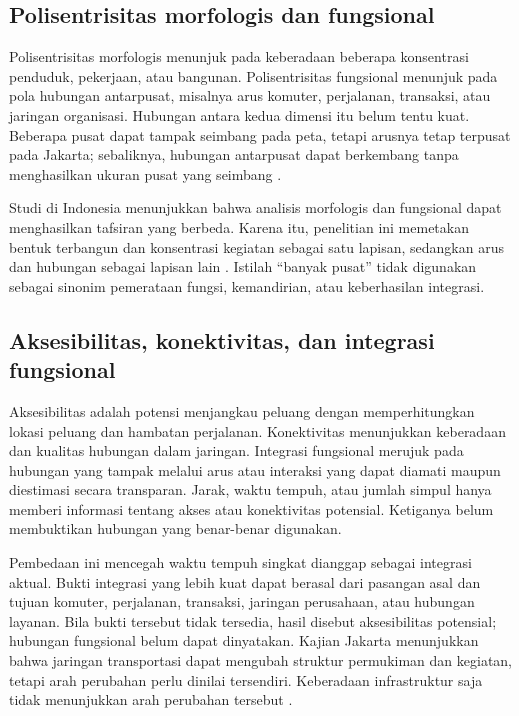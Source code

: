 \documentclass[12pt,a4paper,oneside,openany,indonesian]{report}
\begin{document}
\subsection{Polisentrisitas morfologis dan fungsional}

Polisentrisitas morfologis menunjuk pada keberadaan beberapa konsentrasi penduduk, pekerjaan, atau bangunan. Polisentrisitas fungsional menunjuk pada pola hubungan antarpusat, misalnya arus komuter, perjalanan, transaksi, atau jaringan organisasi. Hubungan antara kedua dimensi itu belum tentu kuat. Beberapa pusat dapat tampak seimbang pada peta, tetapi arusnya tetap terpusat pada Jakarta; sebaliknya, hubungan antarpusat dapat berkembang tanpa menghasilkan ukuran pusat yang seimbang \parencite{burgermeijers2012,degoeietal2010}.

Studi di Indonesia menunjukkan bahwa analisis morfologis dan fungsional dapat menghasilkan tafsiran yang berbeda. Karena itu, penelitian ini memetakan bentuk terbangun dan konsentrasi kegiatan sebagai satu lapisan, sedangkan arus dan hubungan sebagai lapisan lain \parencite{sadewoetal2021}. Istilah ``banyak pusat'' tidak digunakan sebagai sinonim pemerataan fungsi, kemandirian, atau keberhasilan integrasi.

\subsection{Aksesibilitas, konektivitas, dan integrasi fungsional}

Aksesibilitas adalah potensi menjangkau peluang dengan memperhitungkan lokasi peluang dan hambatan perjalanan. Konektivitas menunjukkan keberadaan dan kualitas hubungan dalam jaringan. Integrasi fungsional merujuk pada hubungan yang tampak melalui arus atau interaksi yang dapat diamati maupun diestimasi secara transparan. Jarak, waktu tempuh, atau jumlah simpul hanya memberi informasi tentang akses atau konektivitas potensial. Ketiganya belum membuktikan hubungan yang benar-benar digunakan.

Pembedaan ini mencegah waktu tempuh singkat dianggap sebagai integrasi aktual. Bukti integrasi yang lebih kuat dapat berasal dari pasangan asal dan tujuan komuter, perjalanan, transaksi, jaringan perusahaan, atau hubungan layanan. Bila bukti tersebut tidak tersedia, hasil disebut aksesibilitas potensial; hubungan fungsional belum dapat dinyatakan. Kajian Jakarta menunjukkan bahwa jaringan transportasi dapat mengubah struktur permukiman dan kegiatan, tetapi arah perubahan perlu dinilai tersendiri. Keberadaan infrastruktur saja tidak menunjukkan arah perubahan tersebut \parencite{yudhistiraetal2019}.
\end{document}
